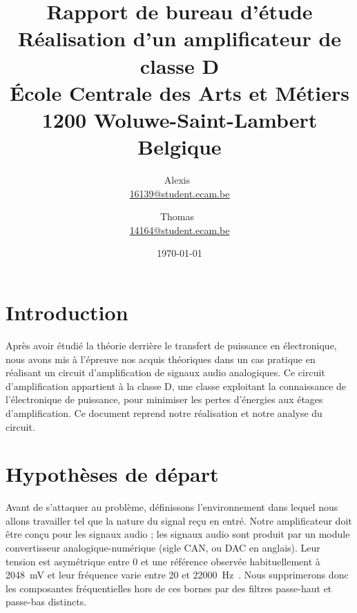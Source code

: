 \documentclass[10pt, oneside, a4paper]{article}
\begin{document}
\begin{titlepage}
    \date{%
        \today
    }
    \author{%
        Alexis~ \\
        \href{mailto:16139@student.ecam.be}{16139@student.ecam.be}
        \and
        Thomas~ \\
        \href{mailto:14164@student.ecam.be}{14164@student.ecam.be}
    }
    \title{%
        \color{gray}\LARGE\bfseries\sffamily
        Rapport de bureau d'étude                  \\[3mm]
        \rm\sffamily\large
        Réalisation d'un amplificateur de classe D \\[7mm]
        École Centrale des Arts et Métiers 		   \\
        1200 Woluwe-Saint-Lambert				   \\
        Belgique
    }
\end{titlepage}

\maketitle
\newpage


\tableofcontents


\newpage
\section*{Introduction}
Après avoir étudié la théorie derrière le transfert de puissance en électronique,
nous avons mis à l'épreuve nos acquis théoriques dans un cas pratique en réalisant un circuit d'amplification de signaux audio analogiques.
Ce circuit d'amplification appartient à la classe D, une classe exploitant la connaissance de l'électronique de puissance, pour minimiser les pertes d'énergies aux étages d'amplification.
Ce document reprend notre réalisation et notre analyse du circuit.


\section{Hypothèses de départ}
	\label{sec:hypothese}
Avant de s'attaquer au problème, définissons l'environnement dans lequel nous allons travailler tel que la nature du signal reçu en entré.
Notre amplificateur doit être conçu pour les signaux audio ;
les signaux audio sont produit par un module convertisseur analogique-numérique (sigle CAN, ou DAC en anglais).
Leur tension est asymétrique entre \num{0} et une référence observée habituellement à \SI{2048}{\milli\volt} et leur fréquence varie entre \num{20} et \SI{22000}{\hertz}~\cite{heffner2007hearing}.
Nous supprimerons donc les composantes fréquentielles hors de ces bornes par des filtres passe-haut et passe-bas distincts.
\end{document}
